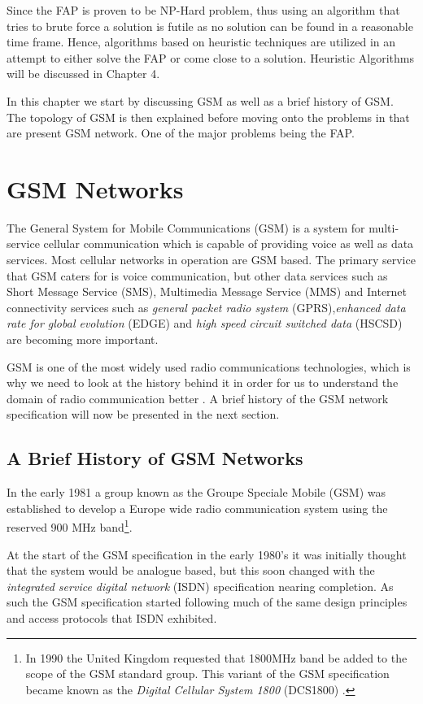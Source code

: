 Since the FAP is proven to be NP-Hard problem, thus using an algorithm that tries to brute force a solution is futile as no solution can be found in a reasonable time frame. Hence, algorithms based on heuristic techniques are utilized in an attempt to either solve the FAP or come close to a solution. Heuristic Algorithms will be discussed in Chapter 4.

In this chapter we start by discussing GSM as well as a brief history of GSM. The topology of GSM is then explained before moving onto the problems in that are present GSM network. One of the major problems being the FAP.

\section{GSM Networks}
The General System for Mobile Communications (GSM) is a system for multi-service cellular communication which is capable of providing voice as well as data services. Most cellular networks in operation 
are GSM based. The primary service that GSM caters for is voice communication, but other data services such as Short Message Service (SMS), Multimedia Message Service (MMS) and Internet 
connectivity services such as \emph{general packet radio system} (GPRS),\emph{enhanced data rate for global evolution} (EDGE) and \emph{high speed circuit switched data} (HSCSD) are becoming more important\cite{GSMArchitectureProtocolsServices,Eisenblatter}.

GSM is one of the most widely used radio communications technologies, which is why we need to look at the history behind it in order for us to understand the domain of radio communication better \cite{GSMArchitectureProtocolsServices}. A brief history of the GSM network specification will now be presented in the next section.

\subsection{A Brief History of GSM Networks}
\label{sec:gsmhistory}
In the early 1981 a group known as the Groupe Speciale Mobile (GSM) was established to develop a Europe wide radio communication system using the reserved 900 MHz band\footnote{In 1990 the United Kingdom requested that 1800MHz band be added to the scope of the GSM standard group. This variant of the GSM specification became known as the \emph{Digital Cellular System 1800} (DCS1800) \cite{GSM92}.}.

At the start of the GSM specification in the early 1980's it was initially thought that the system would be analogue based, but this soon changed with the \emph{integrated service digital network} (ISDN) specification nearing completion. As such the GSM specification started following much of the same design principles and access protocols that ISDN exhibited.

